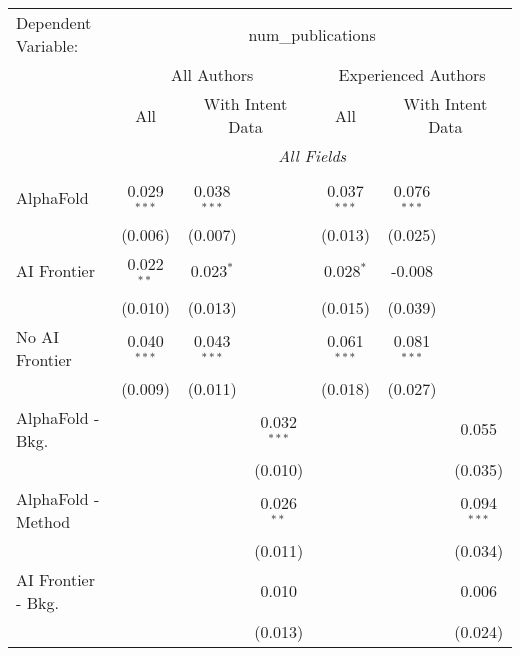 \begingroup
\centering
\begin{tabular}{lcccccc}
   \tabularnewline \midrule \midrule
   Dependent Variable: & \multicolumn{6}{c}{num\_publications}\\
 & \multicolumn{3}{c}{All Authors} & \multicolumn{3}{c}{Experienced Authors} \\
\cmidrule(lr){2-4} \cmidrule(lr){5-7}
 & \multicolumn{1}{c}{All} & \multicolumn{2}{c}{With Intent Data} & \multicolumn{1}{c}{All} & \multicolumn{2}{c}{With Intent Data} \\
\cmidrule(lr){2-2} \cmidrule(lr){3-4} \cmidrule(lr){5-5} \cmidrule(lr){6-7}
 & \multicolumn{6}{c}{\textit{All Fields}} \\ \\
   AlphaFold               & 0.029$^{***}$ & 0.038$^{***}$ &               & 0.037$^{***}$ & 0.076$^{***}$ &   \\   
                           & (0.006)       & (0.007)       &               & (0.013)       & (0.025)       &   \\   
   AI Frontier             & 0.022$^{**}$  & 0.023$^{*}$   &               & 0.028$^{*}$   & -0.008        &   \\   
                           & (0.010)       & (0.013)       &               & (0.015)       & (0.039)       &   \\   
   No AI Frontier          & 0.040$^{***}$ & 0.043$^{***}$ &               & 0.061$^{***}$ & 0.081$^{***}$ &   \\   
                           & (0.009)       & (0.011)       &               & (0.018)       & (0.027)       &   \\   
   AlphaFold - Bkg.        &               &               & 0.032$^{***}$ &               &               & 0.055\\   
                           &               &               & (0.010)       &               &               & (0.035)\\   
   AlphaFold - Method      &               &               & 0.026$^{**}$  &               &               & 0.094$^{***}$\\   
                           &               &               & (0.011)       &               &               & (0.034)\\   
   AI Frontier - Bkg.      &               &               & 0.010         &               &               & 0.006\\   
                           &               &               & (0.013)       &               &               & (0.024)\\   

\end{tabular}
